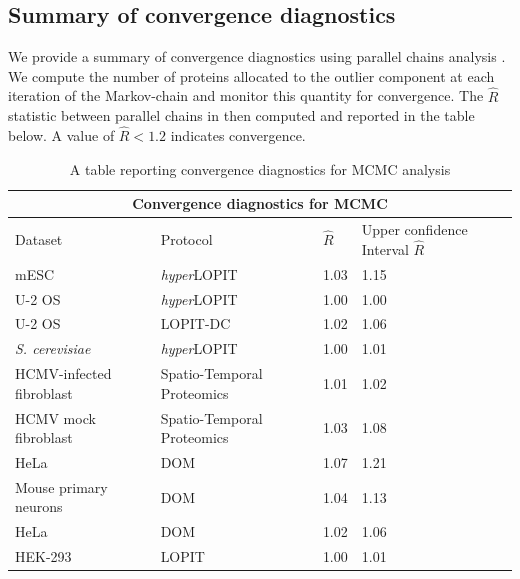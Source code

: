 \documentclass[12pt,english]{article}
\begin{document}
\subsection{Summary of convergence diagnostics}
We provide a summary of convergence diagnostics using parallel chains analysis \citep{Gelman:1992}. We compute the number of proteins allocated to the outlier component at each iteration of the Markov-chain and monitor this quantity for convergence. The $\hat{R}$ statistic between parallel chains in then computed and reported in the table below. A value of $\hat{R} < 1.2$ indicates convergence.
\begin{table}[h]
	\centering
	\footnotesize
	\begin{tabular}{ |p{5cm}|p{3cm}|p{2cm}|p{4cm}|  }
		\hline
		\multicolumn{4}{|c|}{Convergence diagnostics for MCMC} \\
		\hline
		\vfill\hfil Dataset & \vfill\hfil Protocol & \vfill\hfil$\hat{R}$ & \vfill\hfil Upper confidence Interval \vfill\hfil $\hat{R}$   \\
		\hline
		\hline
		mESC  & \textit{hyper}LOPIT&\vfill\hfil 1.03 & \vfill\hfil 1.15 \\
		\hline
		U-2 OS &\textit{hyper}LOPIT & \vfill\hfil 1.00  & \vfill\hfil 1.00\\
		\hline
		U-2 OS &LOPIT-DC  & \vfill\hfil 1.02&\vfill\hfil 1.06\\
		\hline
		\textit{S. cerevisiae} &\textit{hyper}LOPIT & \vfill\hfil 1.00 & \vfill\hfil 1.01\\
		\hline
		HCMV-infected fibroblast& Spatio-Temporal Proteomics &  \vfill\hfil 1.01 & \vfill\hfil 1.02 \\
		\hline
		HCMV mock fibroblast& Spatio-Temporal Proteomics &  \vfill\hfil 1.03 & \vfill\hfil 1.08 \\
		\hline
		HeLa \citep{Itzhak:2016}& DOM &  \vfill\hfil 1.07 & \vfill\hfil 1.21 \\
		\hline
		Mouse primary neurons & DOM &  \vfill\hfil 1.04 & \vfill\hfil 1.13 \\
		\hline
		HeLa \citep{Hirst:2018} & DOM &\vfill\hfil 1.02 & \vfill\hfil 1.06 \\
		\hline
		HEK-293 &LOPIT &  \vfill\hfil 1.00 & \vfill\hfil 1.01 \\
		\hline
		\hline
	\end{tabular}
	\caption{A table reporting convergence diagnostics for MCMC analysis}
	\label{table:mcmcconvergence}
\end{table}
 
\end{document}
